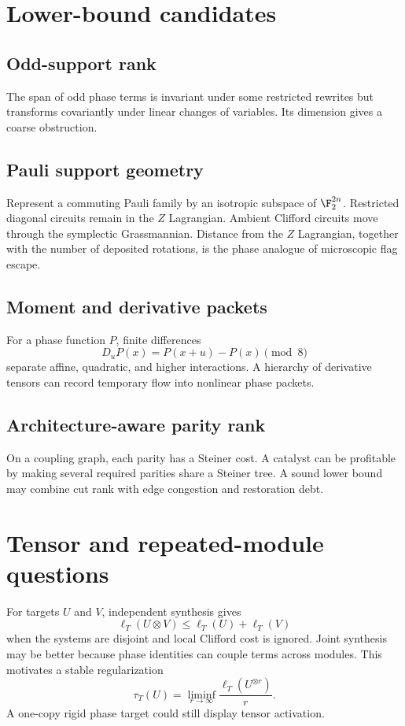 \section{Lower-bound candidates}
\subsection{Odd-support rank}
The span of odd phase terms is invariant under some restricted rewrites but transforms covariantly under linear changes of variables.  Its dimension gives a coarse obstruction.

\subsection{Pauli support geometry}
Represent a commuting Pauli family by an isotropic subspace of $\F_2^{2n}$.  Restricted diagonal circuits remain in the $Z$ Lagrangian.  Ambient Clifford circuits move through the symplectic Grassmannian.  Distance from the $Z$ Lagrangian, together with the number of deposited rotations, is the phase analogue of microscopic flag escape.

\subsection{Moment and derivative packets}
For a phase function $P$, finite differences
\[
D_uP(x)=P(x+u)-P(x)\pmod8
\]
separate affine, quadratic, and higher interactions.  A hierarchy of derivative tensors can record temporary flow into nonlinear phase packets.

\subsection{Architecture-aware parity rank}
On a coupling graph, each parity has a Steiner cost.  A catalyst can be profitable by making several required parities share a Steiner tree.  A sound lower bound may combine cut rank with edge congestion and restoration debt.

\section{Tensor and repeated-module questions}
For targets $U$ and $V$, independent synthesis gives
\[
\ell_T(U\otimes V)
\le
\ell_T(U)+\ell_T(V)
\]
when the systems are disjoint and local Clifford cost is ignored.  Joint synthesis may be better because phase identities can couple terms across modules.  This motivates a stable regularization
\[
\tau_T(U)=
\liminf_{r\to\infty}
\frac{\ell_T(U^{\otimes r})}{r}.
\]
A one-copy rigid phase target could still display tensor activation.

